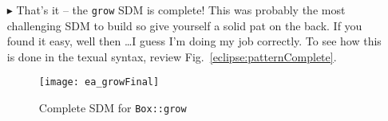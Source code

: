 \begin{itemize}
\vspace{0.5cm}

\item[$\blacktriangleright$]  That's it -- the \texttt{grow} SDM is complete! This was probably the most challenging SDM to build so give yourself a solid 
pat on the back. If you found it easy, well then \ldots I guess I'm doing my job correctly. To see how this is done in the texual syntax, review
Fig.~\ref{eclipse:patternComplete}.

\vspace{0.5cm}

\begin{figure}[htbp]
\begin{center}
  \texttt{[image: ea\_growFinal]}
  \caption{Complete SDM for \texttt{Box::grow}}  
  \label{ea:growComplete}
\end{center}
\end{figure}
\FloatBarrier


\end{itemize}
